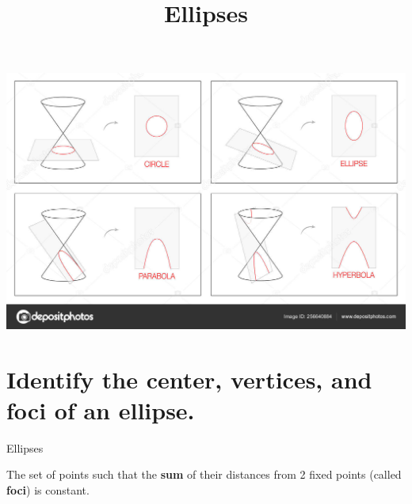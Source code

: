 \documentclass[t,dvipsnames, table]{beamer}
\title{Ellipses}
\author{}
\date{}
\begin{document}
\begin{frame} 
\maketitle
\end{frame}

\begin{frame}[c]
\includegraphics[scale=0.80]{Images/conics.jpg}
\end{frame}

\section{Identify the center, vertices, and foci of an ellipse.}

\begin{frame}{Ellipses}
\begin{tcolorbox}[colback=red!10!white, colframe=red!60!black,, title=\textbf{Ellipses}]
The set of points such that the \textbf{sum} of their distances from 2 fixed points (called \textbf{foci}) is constant.
\end{tcolorbox}
\vspace{11pt}	\pause
\end{frame}
\end{document}
